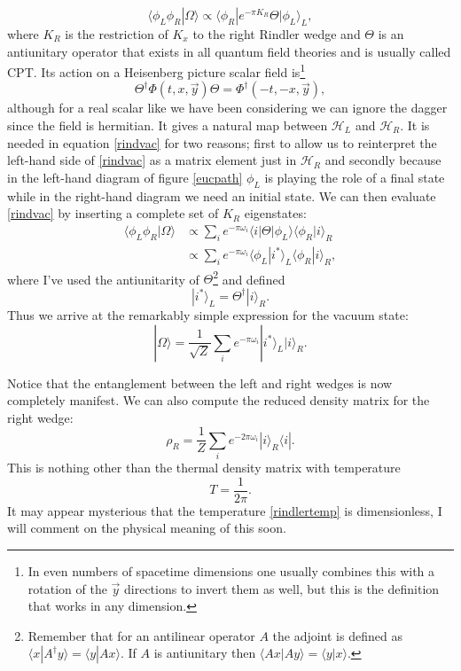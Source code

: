 \documentclass[12pt]{article}
\newcommand{\be}{\begin{equation}}
\newcommand{\ee}{\end{equation}}
\newcommand{\lan}{\langle}
\newcommand{\ran}{\rangle}
\begin{document}
\be\label{rindvac}
\lan \phi_L\phi_R|\Omega\ran\propto \lan \phi_R|e^{-\pi K_R} \Theta |\phi_L\ran_L,
\ee
where $K_R$ is the restriction of $K_x$ to the right Rindler wedge and $\Theta$ is an antiunitary operator that exists in all quantum field theories and is usually called CPT.  Its action on a Heisenberg picture scalar field is\footnote{In even numbers of spacetime dimensions one usually combines this with a rotation of the $\vec{y}$ directions to invert them as well, but this is the definition that works in any dimension.}
\be
\Theta^\dagger \Phi(t,x,\vec{y})\Theta=\Phi^\dagger(-t,-x,\vec{y}),
\ee
although for a real scalar like we have been considering we can ignore the dagger since the field is hermitian.  It gives a natural map between $\mathcal{H}_L$ and $\mathcal{H}_R$.  It is needed in equation \eqref{rindvac} for two reasons; first to allow us to reinterpret the left-hand side of \eqref{rindvac} as a matrix element just in $\mathcal{H}_R$ and secondly because in the left-hand diagram of figure \ref{eucpath} $\phi_L$ is playing the role of a final state while in the right-hand diagram we need an initial state. We can then evaluate \eqref{rindvac} by inserting a complete set of $K_R$ eigenstates:
\begin{align}\nonumber
\lan \phi_L\phi_R|\Omega\ran&\propto \sum_i e^{-\pi \omega_i}\lan i|\Theta |\phi_L\ran\lan \phi_R | i\ran_R \\
&\propto\sum_i e^{-\pi \omega_i}\lan \phi_L|i^*\ran_L \lan \phi_R | i\ran_R ,
\end{align}
where I've used the antiunitarity of $\Theta$\footnote{Remember that for an antilinear operator $A$ the adjoint is defined as $\lan x|A^\dagger y\ran=\lan y|A x\ran$.  If $A$ is antiunitary then $\lan A x| Ay\ran=\lan y|x\ran$.} and defined 
\be
|i^*\ran_L=\Theta^\dagger|i\ran_R.
\ee
Thus we arrive at the remarkably simple expression for the vacuum state:
\be\label{rindvac1}
|\Omega\ran=\frac{1}{\sqrt{Z}}\sum_i e^{-\pi\omega_i}|i^*\ran_L |i\ran_R.
\ee

Notice that the entanglement between the left and right wedges is now completely manifest.  We can also compute the reduced density matrix for the right wedge:
\be
\rho_R=\frac{1}{Z}\sum_i e^{-2\pi \omega_i}|i\ran_R \lan i|.
\ee
This is nothing other than the thermal density matrix with temperature
\be\label{rindlertemp}
T=\frac{1}{2\pi}.
\ee
It may appear mysterious that the temperature \eqref{rindlertemp} is dimensionless, I will comment on the physical meaning of this soon.
\end{document}

